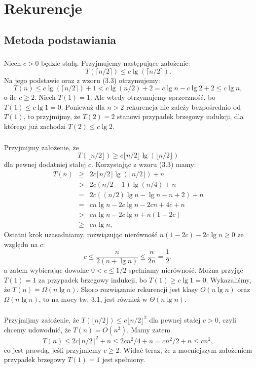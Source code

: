 \chapter{Rekurencje}

\section{Metoda podstawiania}

\subsection{} %
Niech $c>0$ będzie stałą. Przyjmujemy następujące założenie:
\[
	T(\lceil n/2\rceil)\le c\lg(\lceil n/2\rceil).
\]
Na jego podstawie oraz z wzoru (3.3) otrzymujemy:
\[
	T(n)\le c\lg(\lceil n/2\rceil)+1<c\lg (n/2)+2 = c\lg n-c\lg 2+2\le c\lg n,
\]
o ile $c\ge 2$. Niech $T(1)=1$. Ale wtedy otrzymujemy sprzeczność, bo $T(1)\le c\lg 1=0$. Ponieważ dla $n>2$ rekurencja nie zależy bezpośrednio od $T(1)$, to przyjmijmy, że $T(2)=2$ stanowi przypadek brzegowy indukcji, dla którego już zachodzi $T(2)\le c\lg 2$.

\subsection{} %
Przyjmijmy założenie, że
\[
	T(\lfloor n/2\rfloor)\ge c\lfloor n/2\rfloor\lg(\lfloor n/2\rfloor)
\]
dla pewnej dodatniej stałej $c$. Korzystając z wzoru (3.3) mamy:
\begin{eqnarray*}
	T(n) &\ge& 2c\lfloor n/2\rfloor\lg(\lfloor n/2\rfloor)+n \\
	&>& 2c(n/2-1)\lg (n/4)+n \\
	&=& 2c((n/2)\lg n-\lg n-n+2)+n \\
	&=& cn\lg n-2c\lg n-2cn+4c+n \\
	&>& cn\lg n-2c\lg n+n(1-2c) \\
	&\ge& cn\lg n,
\end{eqnarray*}
Ostatni krok uzasadniamy, rozwiązując nierówność $n(1-2c)-2c\lg n\ge 0$ ze względu na $c$:
\[
	c\le \frac{n}{2(n+\lg n)}\le \frac{n}{2n}=\frac{1}{2},
\]
a zatem wybierając dowolne $0<c\le 1/2$ spełniamy nierówność. Można przyjąć $T(1)=1$ za przypadek brzegowy indukcji, bo $T(1)\ge c\lg 1=0$. Wykazaliśmy, że $T(n)=\Omega(n\lg n)$. Skoro rozwiązanie rekurencji jest klasy $O(n\lg n)$ oraz $\Omega(n\lg n)$, to na mocy tw. 3.1, jest również w $\Theta(n\lg n)$.

\subsection{} %
Przyjmijmy założenie, że $T(\lfloor n/2\rfloor)\le c\lfloor n/2\rfloor^2$ dla pewnej stałej $c>0$, czyli chcemy udowodnić, że $T(n)=O(n^2)$. Mamy zatem
\[
	T(n)\le 2c\lfloor n/2\rfloor^2+n\le 2cn^2/4 + n = cn^2/2+n\le cn^2,
\]
co jest prawdą, jeśli przyjmiemy $c\ge 2$. Widać teraz, że z mocniejszym założeniem przypadek brzegowy $T(1)=1$ jest spełniony.

